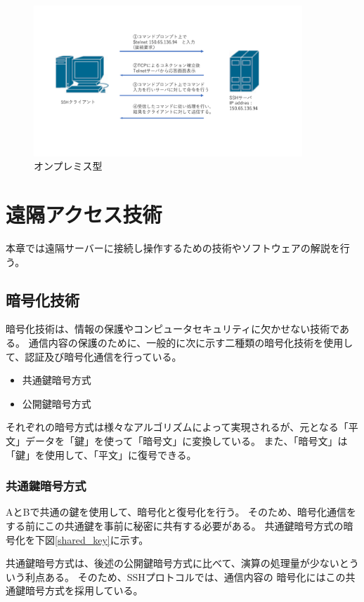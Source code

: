 \documentclass[11pt,a4j,titlepage]{jreport}
\begin{document}
\begin{figure}[h]
    \centering
    \includegraphics*[width=0.9\textwidth,page=15]{graphs/network_archtecture.pdf}
    \caption{オンプレミス型}
    \label{onpremise_graph}
\end{figure}




\chapter{遠隔アクセス技術}
本章では遠隔サーバーに接続し操作するための技術やソフトウェアの解説を行う。

\section{暗号化技術}
暗号化技術は、情報の保護やコンピュータセキュリティに欠かせない技術である。
通信内容の保護のために、一般的に次に示す二種類の暗号化技術を使用して、認証及び暗号化通信を行っている。
\begin{itemize}
    \item 共通鍵暗号方式
    \item 公開鍵暗号方式
\end{itemize}
それぞれの暗号方式は様々なアルゴリズムによって実現されるが、元となる「平文」データを「鍵」を使って「暗号文」に変換している。
また、「暗号文」は「鍵」を使用して、「平文」に復号できる。

\subsection{共通鍵暗号方式}
AとBで共通の鍵を使用して、暗号化と復号化を行う。
そのため、暗号化通信をする前にこの共通鍵を事前に秘密に共有する必要がある。
共通鍵暗号方式の暗号化を下図\ref{shared_key}に示す。

共通鍵暗号方式は、後述の公開鍵暗号方式に比べて、演算の処理量が少ないとういう利点ある。
そのため、SSHプロトコルでは、通信内容の
暗号化にはこの共通鍵暗号方式を採用している。
\end{document}
